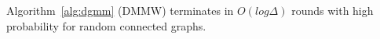 \begin{lem}
\label{lem:dgmm-log}
Algorithm~\ref{alg:dgmm} (DMMW) terminates in $O(log \Delta)$ rounds with high probability for random connected graphs.
\end{lem}
